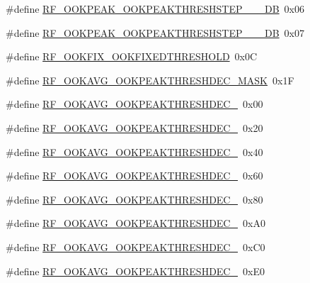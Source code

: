 \begin{DoxyCompactItemize}
\#define \hyperlink{sx1276Regs-Fsk_8h_ae8518d15001ad5791fbeb05923019dec}{R\+F\+\_\+\+O\+O\+K\+P\+E\+A\+K\+\_\+\+O\+O\+K\+P\+E\+A\+K\+T\+H\+R\+E\+S\+H\+S\+T\+E\+P\+\_\+\_\+\_\+\+DB}~0x06
\item 
\#define \hyperlink{sx1276Regs-Fsk_8h_a085b555fd2c09aa73357dc6336eda7ac}{R\+F\+\_\+\+O\+O\+K\+P\+E\+A\+K\+\_\+\+O\+O\+K\+P\+E\+A\+K\+T\+H\+R\+E\+S\+H\+S\+T\+E\+P\+\_\+\_\+\_\+\+DB}~0x07
\item 
\#define \hyperlink{sx1276Regs-Fsk_8h_ad2bf54f789e69283ca0bf08d696bb721}{R\+F\+\_\+\+O\+O\+K\+F\+I\+X\+\_\+\+O\+O\+K\+F\+I\+X\+E\+D\+T\+H\+R\+E\+S\+H\+O\+LD}~0x0C
\item 
\#define \hyperlink{sx1276Regs-Fsk_8h_a2287adb3befe89936e5ed0572c501aa9}{R\+F\+\_\+\+O\+O\+K\+A\+V\+G\+\_\+\+O\+O\+K\+P\+E\+A\+K\+T\+H\+R\+E\+S\+H\+D\+E\+C\+\_\+\+M\+A\+SK}~0x1F
\item 
\#define \hyperlink{sx1276Regs-Fsk_8h_a6c9b34eb4954c700c6f4ba92809d3ffe}{R\+F\+\_\+\+O\+O\+K\+A\+V\+G\+\_\+\+O\+O\+K\+P\+E\+A\+K\+T\+H\+R\+E\+S\+H\+D\+E\+C\+\_}~0x00
\item 
\#define \hyperlink{sx1276Regs-Fsk_8h_aa67814a74e18aba2675aeb52d1ea7b8b}{R\+F\+\_\+\+O\+O\+K\+A\+V\+G\+\_\+\+O\+O\+K\+P\+E\+A\+K\+T\+H\+R\+E\+S\+H\+D\+E\+C\+\_}~0x20
\item 
\#define \hyperlink{sx1276Regs-Fsk_8h_a30ee5ddf6435cc05ce8552efcb7490bd}{R\+F\+\_\+\+O\+O\+K\+A\+V\+G\+\_\+\+O\+O\+K\+P\+E\+A\+K\+T\+H\+R\+E\+S\+H\+D\+E\+C\+\_}~0x40
\item 
\#define \hyperlink{sx1276Regs-Fsk_8h_aea7df55dec934090e2f1f9b6034cd7e9}{R\+F\+\_\+\+O\+O\+K\+A\+V\+G\+\_\+\+O\+O\+K\+P\+E\+A\+K\+T\+H\+R\+E\+S\+H\+D\+E\+C\+\_}~0x60
\item 
\#define \hyperlink{sx1276Regs-Fsk_8h_ad08d706304928ef15901203945928661}{R\+F\+\_\+\+O\+O\+K\+A\+V\+G\+\_\+\+O\+O\+K\+P\+E\+A\+K\+T\+H\+R\+E\+S\+H\+D\+E\+C\+\_}~0x80
\item 
\#define \hyperlink{sx1276Regs-Fsk_8h_a215d216886d5f06e59bd3c2b877f87c2}{R\+F\+\_\+\+O\+O\+K\+A\+V\+G\+\_\+\+O\+O\+K\+P\+E\+A\+K\+T\+H\+R\+E\+S\+H\+D\+E\+C\+\_}~0x\+A0
\item 
\#define \hyperlink{sx1276Regs-Fsk_8h_a05bf8d929b7d885f20888cc7f3332a8a}{R\+F\+\_\+\+O\+O\+K\+A\+V\+G\+\_\+\+O\+O\+K\+P\+E\+A\+K\+T\+H\+R\+E\+S\+H\+D\+E\+C\+\_}~0x\+C0
\item 
\#define \hyperlink{sx1276Regs-Fsk_8h_a3a072ae3ee56b50bf7de60f4469711df}{R\+F\+\_\+\+O\+O\+K\+A\+V\+G\+\_\+\+O\+O\+K\+P\+E\+A\+K\+T\+H\+R\+E\+S\+H\+D\+E\+C\+\_}~0x\+E0

\end{DoxyCompactItemize}
